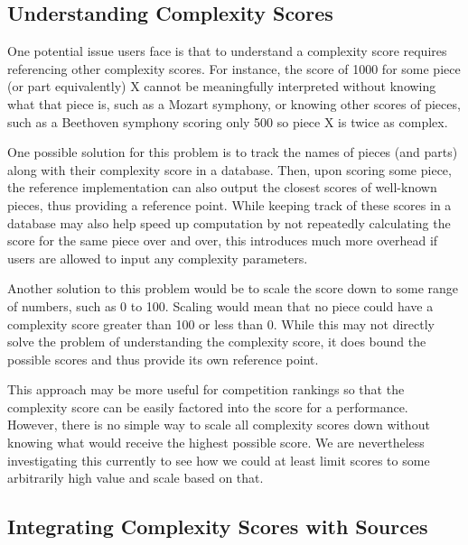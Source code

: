 \documentclass[10pt,preprint]{sigplanconf}
\begin{document}
\subsection{Understanding Complexity Scores}
\label{sec:understand}

One potential issue users face is that to understand a complexity score requires referencing other complexity scores. For instance, the score of 1000 for some piece (or part equivalently) X cannot be meaningfully interpreted without knowing what that piece is, such as a Mozart symphony, or knowing other scores of pieces, such as a Beethoven symphony scoring only 500 so piece X is twice as complex.

One possible solution for this problem is to track the names of pieces (and parts) along with their complexity score in a database. Then, upon scoring some piece, the reference implementation can also output the closest scores of well-known pieces, thus providing a reference point. While keeping track of these scores in a database may also help speed up computation by not repeatedly calculating the score for the same piece over and over, this introduces much more overhead if users are allowed to input any complexity parameters.

Another solution to this problem would be to scale the score down to some range of numbers, such as 0 to 100. Scaling would mean that no piece could have a complexity score greater than 100 or less than 0. While this may not directly solve the problem of understanding the complexity score, it does bound the possible scores and thus provide its own reference point.

This approach may be more useful for competition rankings so that the complexity score can be easily factored into the score for a performance. However, there is no simple way to scale all complexity scores down without knowing what would receive the highest possible score. We are nevertheless investigating this currently to see how we could at least limit scores to some arbitrarily high value and scale based on that.

\subsection{Integrating Complexity Scores with Sources}
\label{sec:integration}
\end{document}

